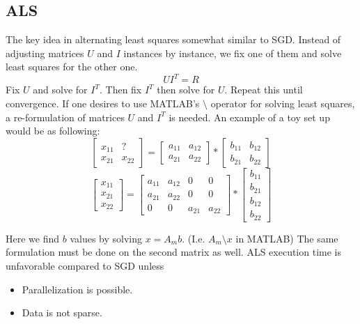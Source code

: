 \documentclass[11pt]{article}
\begin{document}
\begin{multicols}{2}
	\subsection{ALS}
		The key idea in alternating least squares somewhat similar to SGD. Instead of adjusting matrices $U$ and $I$ instances by instance, we fix one of them and solve least squares for the other one.
		$$U I^T = R$$
		Fix $U$ and solve for $I^T$. Then fix $I^T$ then solve for $U$. Repeat this until convergence. If one desires to use MATLAB's $\setminus$ operator for solving least squares, a re-formulation of matrices $U$ and $I^T$ is needed. An example of a toy set up would be as following:
		\[
		\begin{bmatrix}
			x_{11}	& ?  \\
			x_{21}  & x_{22}
		\end{bmatrix}		
		= 		
		\begin{bmatrix}
		a_{11}	& a_{12}  \\
		a_{21}  & a_{22}
		\end{bmatrix}		
		*
		\begin{bmatrix}
		b_{11}	& b_{12}  \\
		b_{21}  & b_{22}
		\end{bmatrix}		
		\]		
		\[
		\begin{bmatrix}
		x_{11}	\\
		x_{21} \\
		x_{22}
		\end{bmatrix}		
		= 
		\begin{bmatrix}
		a_{11} & a_{12} & 0 		& 0 \\
		a_{21} & a_{22} & 0 		& 0    \\
		0		  & 0		  & a_{21} & a_{22}
		\end{bmatrix}		
		*
		\begin{bmatrix}
		b_{11} \\
		b_{21} \\
		b_{12} \\
		b_{22}
		\end{bmatrix}		
		\]
		
		Here we find  $b$ values by solving $x = A_m b$. (I.e. $A_m \setminus x$ in MATLAB) The same formulation must be done on the second matrix as well. ALS execution time is unfavorable \cite{koren} compared to SGD unless 
		\begin{itemize}
			\setlength\itemsep{1mm}
			\item Parallelization is possible.
			\item Data is not sparse.
		\end{itemize}
		

\end{multicols}
\end{document}
